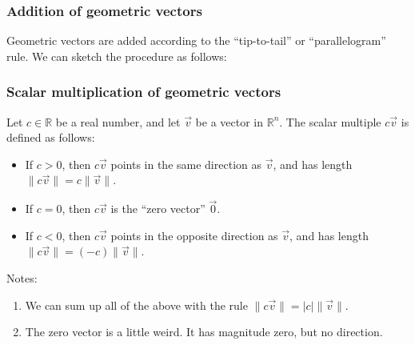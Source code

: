 \documentclass[11pt,t]{beamer}
\newcommand{\R}{\mathbb{R}}
\newcommand{\abs}[1]{\lvert #1\rvert}
\newcommand{\len}[1]{\lVert #1\rVert}
\begin{document}
\begin{frame}
\frametitle{Addition of geometric vectors}

Geometric vectors are added according to the ``tip-to-tail'' or ``parallelogram'' rule. We can sketch the procedure as follows:

\end{frame}
\begin{frame}
\frametitle{Scalar multiplication of geometric vectors}

Let $c\in\R$ be a real number, and let $\vec{v}$ be a vector in $\R^n$. The scalar multiple $c\vec{v}$ is defined as follows:

\begin{itemize}
\item If $c>0$, then $c\vec{v}$ points in the \alert{same} direction as $\vec{v}$, and has length $\len{c\vec{v}} = c\len{\vec{v}}$.
\item If $c=0$, then $c\vec{v}$ is the ``zero vector'' $\vec{0}$.
\item If $c<0$, then $c\vec{v}$ points in the \alert{opposite} direction as $\vec{v}$, and has length $\len{c\vec{v}} = (-c)\len{\vec{v}}$.
\end{itemize}

Notes:
\begin{enumerate}
\item We can sum up all of the above with the rule $\len{c\vec{v}} = \abs{c}\len{\vec{v}}$.
\item The zero vector is a little weird. It has magnitude zero, but \alert{no direction}.
\end{enumerate}
\end{frame}
\end{document}
